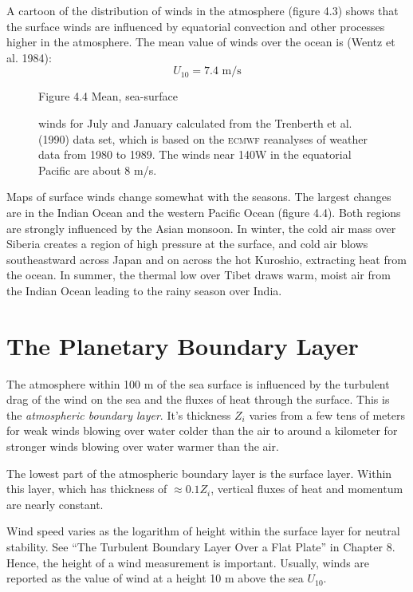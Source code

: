 A cartoon of the distribution of winds in the atmosphere (figure 4.3) shows
that the surface winds are influenced by equatorial convection and other processes
higher in the atmosphere. The mean value of winds over the
ocean is (Wentz et al. 1984):
\begin{equation}
U_{10} = 7.4 \text{ m/s}
\end{equation}

\begin{figure}[b!]
\vspace{-1ex}
{}
\footnotesize
Figure 4.4 Mean, sea-surface \rule{0pt}{3ex}winds for July and January calculated from
the Trenberth et al. (1990) data set, which is  based on the \textsc{ecmwf} reanalyses of
weather data from 1980 to 1989. The winds near 140\degrees W in the equatorial Pacific are
about 8 m/s.
\label{fig:seasonalwinds}
\end{figure}

Maps of surface winds change somewhat with the seasons. The largest
changes are in the Indian Ocean and the western Pacific Ocean (figure 4.4). Both
regions are strongly influenced by the Asian monsoon. In winter, the cold air
mass over Siberia creates a region of high pressure at the surface, and cold air
blows southeastward across Japan and on across the hot Kuroshio,
extracting heat from the ocean. In summer, the thermal low over Tibet draws warm,
moist air from the Indian Ocean leading to the rainy season over India.

\section{The Planetary Boundary Layer}
The atmosphere within 100 m of the sea surface is influenced by the turbulent drag
of the wind on the sea and the fluxes of heat through the surface. This is the
\textit{atmospheric boundary layer}. It's
thickness $Z_i$ varies from a few tens of meters for weak winds blowing over water
colder than the air to around a  kilometer for stronger winds blowing over water
warmer than the air.

The lowest part of the atmospheric boundary layer is the surface layer. Within
this layer, which has thickness of $\approx 0.1 Z_i$, vertical fluxes of
heat and momentum are nearly constant.

Wind speed varies as the logarithm of height within the surface layer for
neutral stability. See ``The Turbulent Boundary Layer Over a Flat Plate'' in
Chapter 8. Hence, the height of a wind measurement is important. Usually, winds
are reported as the value of wind at a height 10 m above the sea $U_{10}$.

